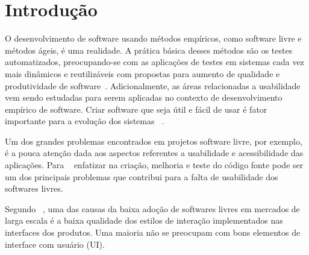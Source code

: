 \chapter{Introdução}

O desenvolvimento de software usando métodos empíricos, como software livre e métodos ágeis, é uma realidade. A prática básica desses métodos são os testes automatizados, preocupando-se com as aplicações de testes em sistemas cada vez mais dinâmicos e reutilizáveis com propostas para aumento de qualidade e produtividade de software~\cite{vicente2010}.
%
Adicionalmente, as áreas relacionadas a usabilidade vem sendo estudadas para serem aplicadas no contexto de desenvolvimento empírico de software. Criar software que seja útil e fácil de usar é fator importante para a evolução dos sistemas ~\cite{santos2012}.

Um dos grandes problemas encontrados em projetos software livre, por exemplo, é a pouca atenção dada aos aspectos referentes a usabilidade e acessibilidade das aplicações. Para ~ enfatizar na criação, melhoria e teste do código fonte pode ser um dos principais problemas que contribui para a falta de usabilidade dos softwares livres.

%
Segundo ~, uma das causas da baixa adoção de softwares livres em mercados de larga escala é a baixa qualidade dos estilos de interação implementados nas interfaces dos produtos. Uma maioria não se preocupam com bons elementos de interface com usuário (UI). 

